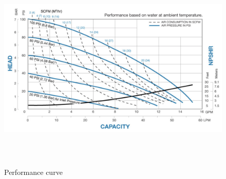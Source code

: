 \begin{figure}[!htpb]
  \centering
  \includegraphics[width = 12cm, height=10cm ]{figures/curve}
  \caption{Performance curve}
  \label{fig:curve}
\end{figure} 
 
